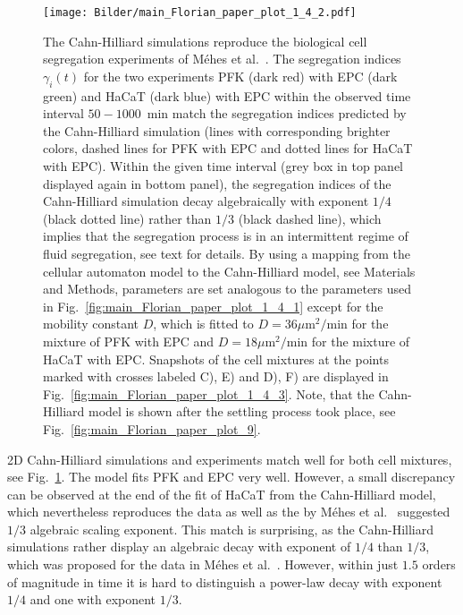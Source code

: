 \documentclass[10pt,letterpaper]{article}
\newcommand{\figref}[1]{Fig.~\ref{fig:#1}}
\begin{document}
\begin{figure}[ht!]
 \centering

 \texttt{[image: Bilder/main\_Florian\_paper\_plot\_1\_4\_2.pdf]}
 \caption{The Cahn-Hilliard simulations reproduce the biological cell
   segregation experiments of Méhes et al.~\cite{MehMonNemVic2012}.
   The segregation indices $\gamma_i(t)$ for the two experiments PFK
   (dark red) with EPC (dark green) and HaCaT (dark blue) with EPC within
   the observed time interval $50 - 1000$~min match the
   segregation indices predicted by the Cahn-Hilliard simulation (lines with
   corresponding brighter colors, dashed lines for PFK with EPC and dotted
   lines for HaCaT with EPC). Within the given time interval (grey box in top
   panel displayed again in bottom panel),
   the segregation indices of the Cahn-Hilliard simulation decay
   algebraically with exponent $1/4$ (black dotted line) rather than
   $1/3$ (black dashed line), which implies that the segregation
   process is in an intermittent regime of fluid segregation, see text
   for details. By using a mapping from the cellular automaton model to
   the Cahn-Hilliard model, see Materials and Methods, parameters
   are set analogous to the parameters used in
   \figref{main_Florian_paper_plot_1_4_1} except for the mobility
   constant $D$, which is fitted to
   $D=36 \text{$\mu $m}^2/\text{min}$ for the mixture of PFK with
   EPC and $D=18 \text{$\mu $m}^2/\text{min}$ for the mixture of
   HaCaT with EPC. Snapshots of the cell mixtures at the points marked
   with crosses labeled C), E) and D), F) are displayed in
   \figref{main_Florian_paper_plot_1_4_3}. Note, that the
   Cahn-Hilliard model is shown after the settling process took place,
   see \figref{main_Florian_paper_plot_9}.}
 \label{fig:main_Florian_paper_plot_1_4_2}
\end{figure}

2D Cahn-Hilliard simulations and experiments match well for both cell
mixtures, see \figref{main_Florian_paper_plot_1_4_2}. The model fits
PFK and EPC very well. However, a small discrepancy can be observed at
the end of the fit of HaCaT from the Cahn-Hilliard model, which
nevertheless reproduces the data as well as the by Méhes et
al.~\cite{MehMonNemVic2012} suggested $1/3$ algebraic scaling exponent.
This match is surprising, as the Cahn-Hilliard simulations rather
display an algebraic decay with exponent of $1/4$ than $1/3$, which
was proposed for the data in Méhes et al.~\cite{MehMonNemVic2012}. However,
within just $1.5$ orders of magnitude in time it is hard to distinguish a
power-law decay with exponent $1/4$ and one with exponent $1/3$.
\end{document}
